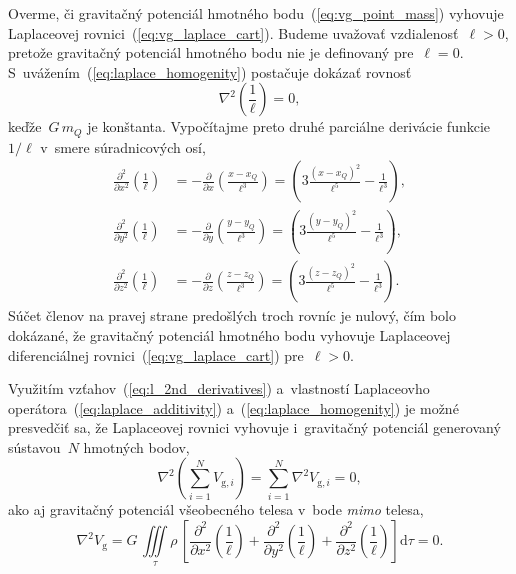 \documentclass[a4paper, 12pt]{book}
\newcommand{\diff}{\mathrm d}
\newcommand{\gidx}{\mathrm g}
\begin{document}
Overme, či gravitačný potenciál hmotného bodu~(\ref{eq:vg_point_mass}) vyhovuje 
Laplaceovej rovnici~(\ref{eq:vg_laplace_cart}).  Budeme uvažovať 
vzdialenosť~$\ell > 0$, pretože gravitačný potenciál hmotného bodu nie je 
definovaný pre~$\ell = 0$.  S~uvážením~(\ref{eq:laplace_homogenity}) postačuje 
dokázať rovnosť
%
\begin{equation}
\label{eq:nabla_l}
\nabla^2 \left( \frac{1}{\ell} \right) = 0{,}
\end{equation}
%
keďže~$G \, m_Q$ je konštanta.  Vypočítajme preto druhé parciálne
derivácie funkcie~$1 \slash \ell$ v~smere súradnicových osí,
%
\begin{equation}
\label{eq:l_2nd_derivatives}
\begin{split}
\frac{\partial^2}{\partial x^2} \left( \frac{1}{\ell} \right) &=
-\frac{\partial}{\partial x} \left( \frac{x - x_Q}{\ell^3} \right) = \left(3
\frac{(x - x_Q)^2}{\ell^5} - \frac{1}{\ell^3} \right){,}\\
%
\frac{\partial^2}{\partial y^2} \left( \frac{1}{\ell} \right) &=
-\frac{\partial}{\partial y} \left( \frac{y - y_Q}{\ell^3} \right) = \left(3
\frac{(y - y_Q)^2}{\ell^5} - \frac{1}{\ell^3} \right){,}\\
%
\frac{\partial^2}{\partial z^2} \left( \frac{1}{\ell} \right) &=
-\frac{\partial}{\partial z} \left( \frac{z - z_Q}{\ell^3} \right) = \left(3
\frac{(z - z_Q)^2}{\ell^5} - \frac{1}{\ell^3} \right){.}
\end{split}
\end{equation}
%
Súčet členov na pravej strane predošlých troch rovníc je nulový, čím bolo
dokázané, že gravitačný potenciál hmotného bodu vyhovuje Laplaceovej
diferenciálnej rovnici~(\ref{eq:vg_laplace_cart}) pre~$\ell > 0$.

Využitím vzťahov~(\ref{eq:l_2nd_derivatives}) a~vlastností Laplaceovho
operátora~(\ref{eq:laplace_additivity}) a~(\ref{eq:laplace_homogenity}) je
možné presvedčiť sa, že Laplaceovej rovnici vyhovuje i~gravitačný potenciál
generovaný sústavou~$N$ hmotných bodov,
%
\begin{equation}
\nabla^2 \left( \sum_{i = 1}^N V_{\gidx,i} \right) = \sum_{i = 1}^N \nabla^2
V_{\gidx,i} = 0{,}
\end{equation}
%
ako aj gravitačný potenciál všeobecného telesa v~bode \emph{mimo} telesa,
%
\begin{equation}
\nabla^2 V_\gidx = G\, \iiint\limits_\tau \rho \, \left[ 
\frac{\partial^2}{\partial
x^2}\left(\frac{1}{\ell}\right) + \frac{\partial^2}{\partial
y^2}\left(\frac{1}{\ell}\right) + \frac{\partial^2}{\partial
z^2}\left(\frac{1}{\ell}\right) \right] \diff\tau = 0{.}
\end{equation}
\end{document}
